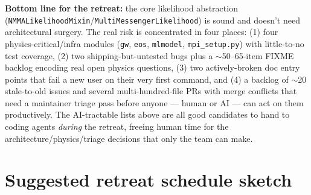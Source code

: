 \documentclass[10pt]{article}
\newcommand{\code}[1]{\texttt{#1}}
\begin{document}
\noindent\textbf{Bottom line for the retreat:} the core likelihood abstraction
(\code{NMMALikelihoodMixin}/\code{MultiMessengerLikelihood}) is sound and doesn't
need architectural surgery. The real risk is concentrated in four places: (1) four
physics-critical/infra modules (\code{gw}, \code{eos}, \code{mlmodel},
\code{mpi\_setup.py}) with little-to-no test coverage, (2) two shipping-but-untested
bugs plus a $\sim$50--65-item FIXME backlog encoding real open physics questions,
(3) two actively-broken doc entry points that fail a new user on their very first
command, and (4) a backlog of $\sim$20 stale-to-old issues and several
multi-hundred-file PRs with merge conflicts that need a maintainer triage pass
before anyone --- human or AI --- can act on them productively. The AI-tractable
lists above are all good candidates to hand to coding agents \emph{during} the
retreat, freeing human time for the architecture/physics/triage decisions that
only the team can make.

\section{Suggested retreat schedule sketch}
\end{document}

